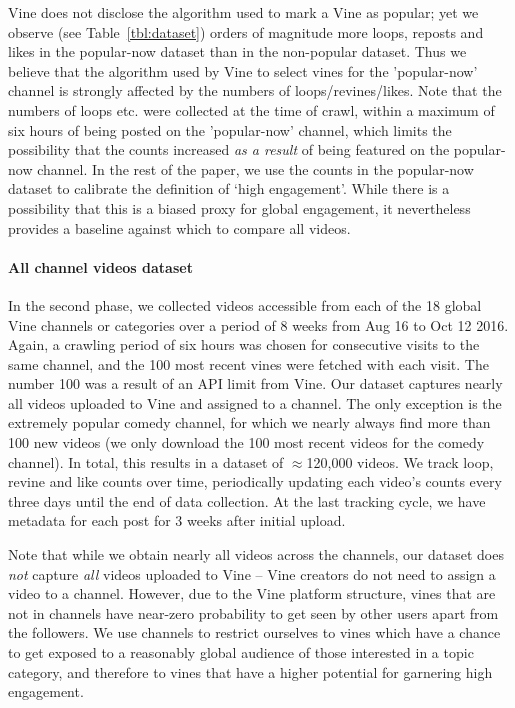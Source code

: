 Vine does not disclose the algorithm used to mark a Vine as popular; yet we observe (see Table~\ref{tbl:dataset}) orders of magnitude more loops, reposts and likes in the popular-now dataset than in the non-popular dataset. Thus we believe that the algorithm used by Vine to select vines for the 'popular-now' channel is strongly affected by the numbers of loops/revines/likes. Note that the numbers of loops etc. were collected at the time of crawl, within a maximum of six hours of being posted on the 'popular-now' channel, which limits the possibility that the counts increased \emph{as a result} of being featured on the popular-now channel. In the rest of the paper, we use the counts in the popular-now dataset to calibrate the definition of `high engagement'. While there is a possibility that this is a biased proxy for global engagement, it nevertheless provides a baseline against which to compare all videos.

\paragraph{All channel videos dataset} In the second phase, we collected 
videos accessible from each of the 18 global Vine channels or categories%
over a period of {8 weeks} from {Aug 16 to Oct 12  2016}. Again, a crawling period of six hours was chosen for consecutive visits to the same channel, and the 100 most recent vines were fetched with each visit. The number 100 was a result of an API limit from Vine. 
Our dataset captures nearly all videos uploaded to Vine and assigned to a channel. The only exception is the extremely popular comedy channel, for which we nearly always find more than 100 new videos (we only download the 100 most recent videos for the comedy channel). In total, this results in a dataset of $\approx$120,000 videos. We track  loop, revine and like counts  over time, periodically updating each video's counts every three days until the end of  data collection. At the last tracking cycle, we have metadata for each post for  3 weeks after initial  upload.

Note that while we obtain nearly all videos across the channels, our dataset does \emph{not} capture  \emph{all} videos uploaded to Vine -- Vine creators do not need to assign a video to a channel. However, due to the Vine platform structure,  vines that are not in channels have near-zero probability to get seen by other users apart from the followers. %
We use channels to restrict ourselves to vines which have a chance to get exposed to a reasonably global audience of those interested in a topic category, and therefore to vines that have a higher potential for garnering high engagement. 


